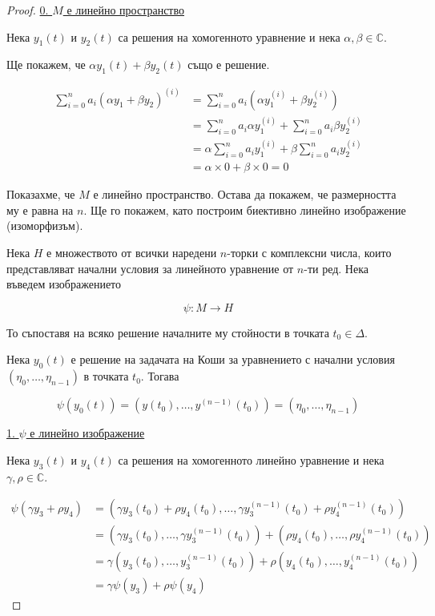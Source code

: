 \documentclass{scrartcl}
\begin{document}
\begin{FlushLeft}
\begin{proof}
\underline{0. $M$ е линейно пространство}

Нека $y_1(t)$ и $y_2(t)$ са решения на хомогенното уравнение и нека $\alpha, \beta \in \mathbb{C}$.

Ще покажем, че $\alpha y_1(t) + \beta y_2(t)$ също е решение.

\begin{align*}
    \sum_{i=0}^n a_i(\alpha y_1 + \beta y_2)^{(i)} & = \sum_{i=0}^n a_i(\alpha y_1^{(i)} + \beta y_2^{(i)})\\
    & = \sum_{i=0}^n a_i\alpha y_1^{(i)} + \sum_{i=0}^n a_i \beta y_2^{(i)}\\
    & = \alpha \sum_{i=0}^n a_i y_1^{(i)} + \beta \sum_{i=0}^n a_i y_2^{(i)}\\
    & = \alpha \times 0 + \beta \times 0 = 0
\end{align*}

Показахме, че $M$ е линейно пространство. Остава да покажем, че размерността му е равна на $n$. Ще го покажем, като построим биективно линейно изображение (изоморфизъм).

Нека $H$ е множеството от всички наредени $n$-торки с комплексни числа, които представляват начални условия за линейното уравнение от $n$-ти ред. Нека въведем изображението

$$\psi: M \to H$$

То съпоставя на всяко решение началните му стойности в точката $t_0 \in \Delta$.

Нека $y_0(t)$ е решение на задачата на Коши за уравнението с начални условия $(\eta_0, \dots, \eta_{n-1})$ в точката $t_0$. Тогава

$$\psi(y_0(t)) = (y(t_0), \dots, y^{(n-1)}(t_0)) = (\eta_0, \dots, \eta_{n-1})$$

\underline{1. $\psi$ е линейно изображение}

Нека $y_3(t)$ и $y_4(t)$ са решения на хомогенното линейно уравнение и нека $\gamma, \rho \in \mathbb{C}$.

\begin{align*}
    \psi(\gamma y_3 + \rho y_4) & = (\gamma y_3(t_0) + \rho y_4(t_0), \dots, \gamma y_3^{(n-1)}(t_0) + \rho y_4^{(n-1)}(t_0))\\
    & = (\gamma y_3(t_0), \dots, \gamma y_3^{(n-1)}(t_0)) + (\rho y_4(t_0), \dots, \rho y_4^{(n-1)}(t_0))\\
    & = \gamma(y_3(t_0), \dots, y_3^{(n-1)}(t_0)) + \rho (y_4(t_0), \dots, y_4^{(n-1)}(t_0))\\
    & = \gamma \psi(y_3) + \rho \psi(y_4)
\end{align*}


\end{proof}
\end{FlushLeft}
\end{document}
